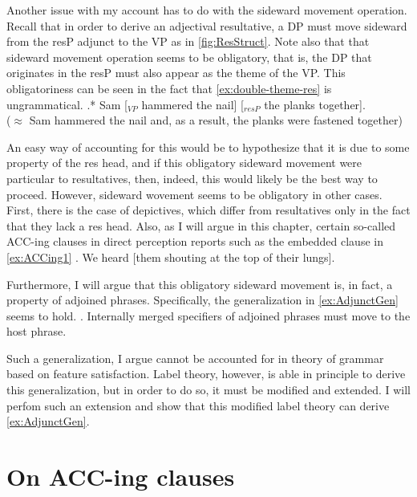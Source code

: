 \documentclass[MilwayThesis]{subfiles}
\begin{document}
Another issue with my account has to do with the sideward movement operation.
Recall that in order to derive an adjectival resultative, a DP must move sideward from the resP adjunct to the VP as in \cref{fig:ResStruct}.
Note also that that sideward movement operation seems to be obligatory, that is, the DP that originates in the resP must also appear as the theme of the VP.
This obligatoriness can be seen in the fact that \cref{ex:double-theme-res} is ungrammatical.
\ex.*  Sam [$_{VP}$ hammered the nail] [$_{resP}$ the planks together].\label{ex:double-theme-res}\\
($\approx$ Sam hammered the nail and, as a result, the planks were fastened together)

An easy way of accounting for this would be to hypothesize that it is due to some property of the res head, and if this obligatory sideward movement were particular to resultatives, then, indeed, this would likely be the best way to proceed.
However, sideward wovement seems to be obligatory in other cases.
First, there is the case of depictives, which differ from resultatives only in the fact that they lack a res head.
Also, as I will argue in this chapter, certain so-called ACC-ing clauses in direct perception reports such as the embedded clause in \cref{ex:ACCing1} 
\ex. We heard [them shouting at the top of their lungs].\label{ex:ACCing1}

Furthermore, I will argue that this obligatory sideward movement is, in fact, a property of adjoined phrases.
Specifically, the generalization in \cref{ex:AdjunctGen} seems to hold.
\ex.\label{ex:AdjunctGen} Internally merged specifiers of adjoined phrases must move to the host phrase.

Such a generalization, I argue cannot be accounted for in theory of grammar based on feature satisfaction.
Label theory, however, is able in principle to derive this generalization, but in order to do so, it must be modified and extended.
I will perfom such an extension and show that this modified label theory can derive \cref{ex:AdjunctGen}.

\section{On ACC-ing clauses}
\end{document}
